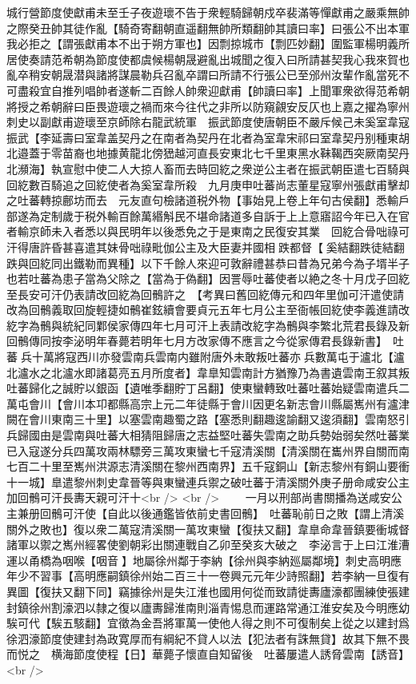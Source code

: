 城行營節度使獻甫未至壬子夜遊瓌不告于衆輕騎歸朝戍卒裴滿等憚獻甫之嚴乘無帥之際癸丑帥其徒作亂【騎奇寄翻朝直遥翻無帥所類翻帥其讀曰率】曰張公不出本軍我必拒之【謂張獻甫本不出于朔方軍也】因剽掠城市【剽匹妙翻】圍監軍楊明義所居使奏請范希朝為節度使都虞候楊朝晟避亂出城聞之復入曰所請甚契我心我來賀也亂卒稍安朝晟潜與諸將謀晨勒兵召亂卒謂曰所請不行張公已至邠州汝輩作亂當死不可盡殺宜自推列唱帥者遂斬二百餘人帥衆迎獻甫【帥讀曰率】上聞軍衆欲得范希朝將授之希朝辭曰臣畏遊瓌之禍而來今往代之非所以防窺覦安反仄也上嘉之擢為寧州刺史以副獻甫遊瓌至京師除右龍武統軍　振武節度使唐朝臣不嚴斥候己未奚室韋寇振武【李延壽曰室韋盖契丹之在南者為契丹在北者為室韋宋祁曰室韋契丹别種東胡北邉蓋于零苗裔也地據黄龍北傍峱越河直長安東北七千里東黑水靺鞨西突厥南契丹北瀕海】執宣慰中使二人大掠人畜而去時回紇之衆逆公主者在振武朝臣遣七百騎與回紇數百騎追之回紇使者為奚室韋所殺　九月庚申吐蕃尚志董星寇寧州張獻甫擊却之吐蕃轉掠鄜坊而去　元友直句檢諸道税外物【事始見上卷上年句古侯翻】悉輸戶部遂為定制歲于税外輸百餘萬緡斛民不堪命諸道多自訴于上上意寤詔今年已入在官者輸京師未入者悉以與民明年以後悉免之于是東南之民復安其業　回紇合骨咄祿可汗得唐許昏甚喜遣其妹骨咄祿毗伽公主及大臣妻并國相跌都督【奚結翻跌徒結翻跌與回紇同出鐵勒而異種】以下千餘人來迎可敦辭禮甚恭曰昔為兄弟今為子壻半子也若吐蕃為患子當為父除之【當為于偽翻】因詈辱吐蕃使者以絶之冬十月戊子回紇至長安可汗仍表請改回紇為回鶻許之　【考異曰舊回紇傳元和四年里伽可汗遣使請改為回鶻義取回旋輕捷如鶻崔鉉續會要貞元五年七月公主至衙帳回紇使李義進請改紇字為鶻與統紀同鄴侯家傳四年七月可汗上表請改紇字為鶻與李繁北荒君長錄及新回鶻傳同按李泌明年春薨若明年七月方改家傳不應言之今從家傳君長錄新書】　吐蕃兵十萬將寇西川亦發雲南兵雲南内雖附唐外未敢叛吐蕃亦兵數萬屯于瀘北【瀘北瀘水之北瀘水即諸葛亮五月所度者】韋臯知雲南計方猶豫乃為書遺雲南王叙其叛吐蕃歸化之誠貯以銀函【遺唯季翻貯丁呂翻】使東蠻轉致吐蕃吐蕃始疑雲南遣兵二萬屯會川【會川本卭都縣高宗上元二年徒縣于會川因更名新志會川縣屬嶲州有瀘津闕在會川東南三十里】以塞雲南趣蜀之路【塞悉則翻趣逡諭翻又逡須翻】雲南怒引兵歸國由是雲南與吐蕃大相猜阻歸唐之志益堅吐蕃失雲南之助兵勢始弱矣然吐蕃業已入寇遂分兵四萬攻兩林驃旁三萬攻東蠻七千寇清溪關【清溪關在巂州界自關而南七百二十里至嶲州洪源志清溪關在黎州西南界】五千寇銅山【新志黎州有銅山要衝十一城】臯遣黎州刺史韋晉等與東蠻連兵禦之破吐蕃于清溪關外庚子册命咸安公主加回鶻可汗長夀天親可汗十<br />
<br />
　　一月以刑部尚書關播為送咸安公主兼册回鶻可汗使【自此以後通鑑皆依前史書回鶻】　吐蕃恥前日之敗【謂上清溪關外之敗也】復以衆二萬寇清溪關一萬攻東蠻【復扶又翻】韋臯命韋晉鎮要衝城督諸軍以禦之嶲州經畧使劉朝彩出關連戰自乙卯至癸亥大破之　李泌言于上曰江淮漕運以甬橋為咽喉【咽音】地屬徐州鄰于李納【徐州與李納廵屬鄰境】刺史高明應年少不習事【高明應嗣鎮徐州始二百三十一卷興元元年少詩照翻】若李納一旦復有異圖【復扶又翻下同】竊據徐州是失江淮也國用何從而致請徙夀廬濠都團練使張建封鎮徐州割濠泗以隸之復以廬夀歸淮南則淄青惕息而運路常通江淮安矣及今明應幼騃可代【騃五駭翻】宜徵為金吾將軍萬一使他人得之則不可復制矣上從之以建封爲徐泗濠節度使建封為政寛厚而有綱紀不貸人以法【犯法者有誅無貸】故其下無不畏而悦之　横海節度使程【日】華薨子懷直自知留後　吐蕃屢遣人誘脅雲南【誘音】<br />

